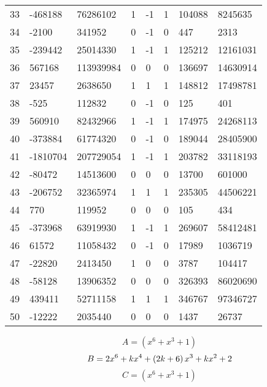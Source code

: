 \documentclass{amsart}
\begin{document}
\begin{longtable}{|l|l|l|lllll|}
33&-468188&76286102&1&-1&1&104088&8245635\\
34&-2100&341952&0&-1&0&447&2313\\
35&-239442&25014330&1&-1&1&125212&12161031\\
36&567168&113939984&0&0&0&136697&14630914\\
37&23457&2638650&1&1&1&148812&17498781\\
38&-525&112832&0&-1&0&125&401\\
39&560910&82432966&1&-1&1&174975&24268113\\
40&-373884&61774320&0&-1&0&189044&28405900\\
41&-1810704&207729054&1&-1&1&203782&33118193\\
42&-80472&14513600&0&0&0&13700&601000\\
43&-206752&32365974&1&1&1&235305&44506221\\
44&770&119952&0&0&0&105&434\\
45&-373968&63919930&1&-1&1&269607&58412481\\
46&61572&11058432&0&-1&0&17989&1036719\\
47&-22820&2413450&1&0&0&3787&104417\\
48&-58128&13906352&0&0&0&326393&86020690\\
49&439411&52711158&1&1&1&346767&97346727\\
50&-12222&2035440&0&0&0&1437&26737\\
\hline
\end{longtable}
$$A=(x^6
 + x^3
 + 1)$$
$$B=2\*x^6
 + k\*x^4
 + \left(2\*k
 + 6\right) \*x^3
 + k\*x^2
 + 2$$
$$C=(x^6
 + x^3
 + 1)$$
\end{document}
